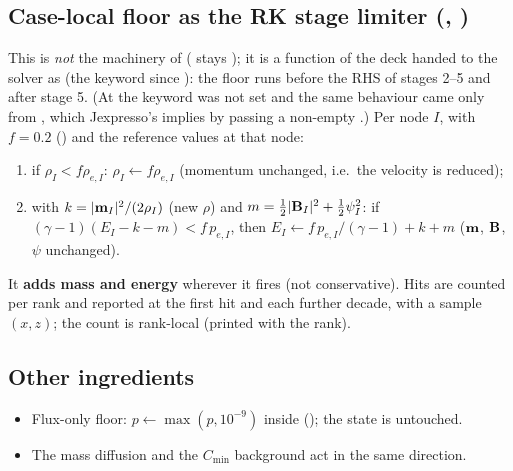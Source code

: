 \documentclass[10pt]{article}
\begin{document}
\subsection*{Case-local floor as the RK stage limiter (, )}
This is \emph{not} the  machinery of  (
stays ); it is a function of the deck handed to the solver as
(the keyword since ): the floor runs before the RHS of stages 2--5 and after stage 5. (At \commit{} the
keyword was not set and the same behaviour came only from , which Jexpresso's  implies
by passing a non-empty .)
Per node $I$, with $f=0.2$ () and the reference values at that node:
\begin{enumerate}[leftmargin=*]
\item if $\rho_I<f\rho_{e,I}$: $\rho_I\leftarrow f\rho_{e,I}$ (momentum unchanged, i.e.\ the velocity is reduced);
\item with $k=|\mathbf{m}_I|^2/(2\rho_I)$ (new $\rho$) and $m=\tfrac12|\mathbf{B}_I|^2+\tfrac12\psi_I^2$: if
$(\gamma-1)(E_I-k-m)<f\,p_{e,I}$, then $E_I\leftarrow f\,p_{e,I}/(\gamma-1)+k+m$ ($\mathbf{m}$, $\mathbf{B}$, $\psi$ unchanged).
\end{enumerate}
It \textbf{adds mass and energy} wherever it fires (not conservative). Hits are counted per rank and
reported at the first hit and each further decade, with a sample $(x,z)$; the count is rank-local
(printed with the  rank).

\subsection*{Other ingredients}
\begin{itemize}[leftmargin=*]
\item Flux-only floor: $p\leftarrow\max(p,10^{-9})$ inside  (); the state is untouched.
\item The \dsgs{} mass diffusion and the $C_{\min}$ background act in the same direction.
\end{itemize}
\end{document}
